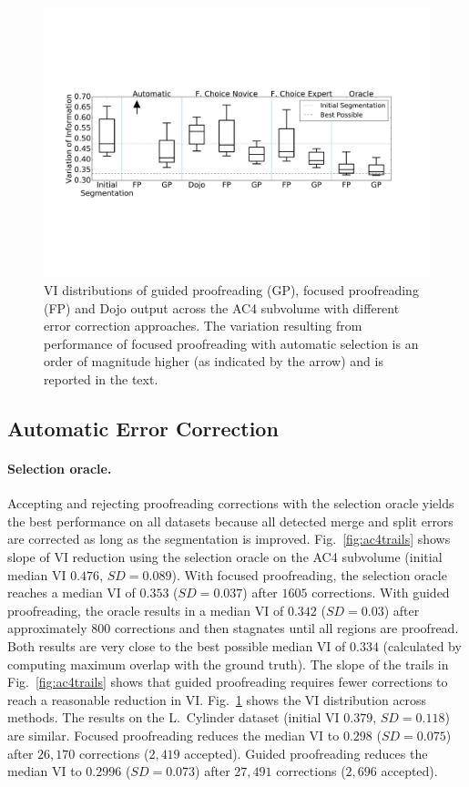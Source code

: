 \begin{figure}[t]
\begin{center}
\includegraphics[width=\linewidth]{gfx/ac4boxplot.pdf}
\end{center}
  \vspace{-4mm}
   \caption{VI distributions of guided proofreading (GP), focused proofreading (FP) and Dojo output across the AC4 subvolume with different error correction approaches. The variation resulting from performance of focused proofreading with automatic selection is an order of magnitude higher (as indicated by the arrow) and is reported in the text.}
\label{fig:ac4boxplot}
\end{figure}
\subsection{Automatic Error Correction}

\paragraph{Selection oracle.} Accepting and rejecting proofreading corrections with the selection oracle yields the best performance on all datasets because all detected merge and split errors are corrected as long as the segmentation is improved. Fig.~\ref{fig:ac4trails} shows slope of VI reduction using the selection oracle on the AC4 subvolume (initial median VI $0.476$, $SD=0.089$). With focused proofreading, the selection oracle reaches a median VI of $0.353$ ($SD=0.037$) after $1605$ corrections. With guided proofreading, the oracle results in a median VI of $0.342$ ($SD=0.03$) after approximately $800$ corrections and then stagnates until all regions are proofread. Both results are very close to the best possible median VI of $0.334$ (calculated by computing maximum overlap with the ground truth). The slope of the trails in Fig.~\ref{fig:ac4trails} shows that guided proofreading requires fewer corrections to reach a reasonable reduction in VI. Fig.~\ref{fig:ac4boxplot} shows the VI distribution across methods.
The results on the L.~Cylinder dataset (initial VI $0.379$, $SD=0.118$) are similar. Focused proofreading reduces the median VI to $0.298$ ($SD=0.075$) after $26,170$ corrections ($2,419$ accepted). Guided proofreading reduces the median VI to $0.2996$ ($SD=0.073$) after $27,491$ corrections ($2,696$ accepted).


